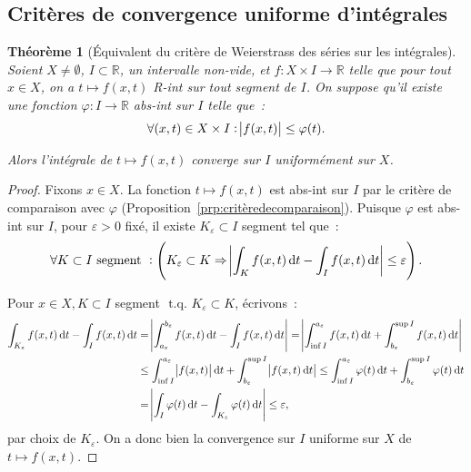 \documentclass{report}
\newtheorem{thm}{Théorème}[chapter]
\theoremstyle{definition}
\theoremstyle{remark}
\numberwithin{equation}{section}
\newcommand{\R}{\mathbb R}
\newcommand{\tq}{\text{ t.q. }}
\begin{document}
		\subsection{Critères de convergence uniforme d'intégrales}
			\begin{thm}[Équivalent du critère de Weierstrass des séries sur les intégrales] Soient $X \neq \emptyset$, $I \subset \R$, un intervalle non-vide,
			et $f : X \times I \to \R$ telle que pour tout $x \in X$, on a $t \mapsto f(x, t)$ R-int sur tout segment de $I$. On suppose qu'il existe une
			fonction $\varphi : I \to \R$ abs-int sur $I$ telle que~:
			\begin{equation}
				\forall (x, t) \in X \times I : \abs {f(x, t)} \leq \varphi(t).
			\end{equation}

			Alors l'intégrale de $t \mapsto f(x, t)$ converge sur $I$ uniformément sur $X$.
			\end{thm}

			\begin{proof} Fixons $x \in X$. La fonction $t \mapsto f(x, t)$ est abs-int sur $I$ par le critère de comparaison avec $\varphi$
			(Proposition~\ref{prp:critèredecomparaison}). Puisque $\varphi$ est abs-int sur $I$, pour $\varepsilon > 0$ fixé, il existe $K_\varepsilon \subset I$
			segment tel que~:
			\begin{equation}
				\forall K \subset I \text{ segment } : \left(K_\varepsilon \subset K \Rightarrow \abs {\int_K f(x, t)\dif t - \int_I f(x, t)\dif t}
				\leq \varepsilon\right).
			\end{equation}

			Pour $x \in X, K \subset I$ segment $\tq K_\varepsilon \subset K$, écrivons~:
			\begin{align}
				\int_{K_\varepsilon} f(x, t)\dif t - \int_I f(x, t)\dif t &= \abs {\int_{a_\varepsilon}^{b_\varepsilon} f(x, t)\dif t - \int_I f(x, t)\dif t}
					= \abs {\int_{\inf I}^{a_\varepsilon}f(x, t)\dif t + \int_{b_\varepsilon}^{\sup I}f(x, t)\dif t} \\
				&\leq \int_{\inf I}^{a_\varepsilon}\abs {f(x, t)}\dif t + \int_{b_\varepsilon}^{\sup I}\abs {f(x, t)\dif t}
					\leq \int_{\inf I}^{a_\varepsilon}\varphi(t)\dif t + \int_{b_\varepsilon}^{\sup I}\varphi(t)\dif t \\
				&= \abs {\int_I\varphi(t)\dif t - \int_{K_\varepsilon}\varphi(t)\dif t} \leq \varepsilon,
			\end{align}
			par choix de $K_\varepsilon$. On a donc bien la convergence sur $I$ uniforme sur $X$ de $t \mapsto f(x, t)$.
			\end{proof}
\end{document}
